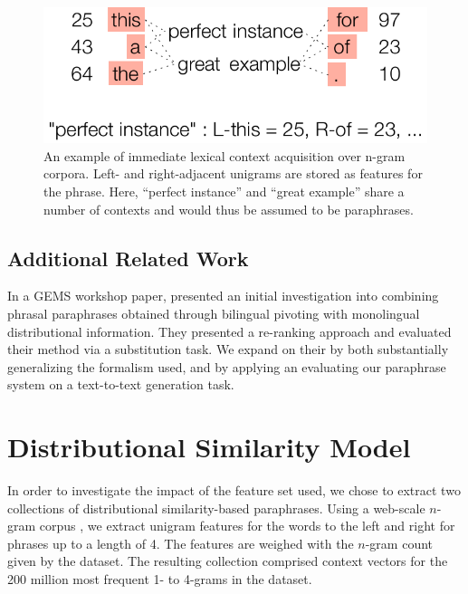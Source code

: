 \documentclass[11pt]{article}
\begin{document}
\begin{figure}[!t]
\begin{center}
\includegraphics[width=0.99\linewidth]{figures/ngram_context.pdf}
\end{center}
\caption{An example of immediate lexical context acquisition over
  n-gram corpora. Left- and right-adjacent unigrams are stored as
  features for the phrase. Here, ``perfect instance'' and ``great
  example'' share a number of contexts and would thus be assumed to be
  paraphrases.}\label{fig-ngram-context}
\end{figure}


\subsection{Additional Related Work}

In a GEMS workshop paper,  presented an initial investigation into combining phrasal
paraphrases obtained through bilingual pivoting with monolingual
distributional information. They presented a re-ranking approach and
evaluated their method via a substitution task. We expand on their by
both substantially generalizing the formalism used, and by applying an
evaluating our paraphrase system on a text-to-text generation task.


\section{Distributional Similarity Model}
In order to investigate the impact of the feature set used, we chose
to extract two collections of distributional similarity-based
paraphrases. Using a web-scale $n$-gram corpus
\cite{GoogleNgrams,LinEtAlLREC10}, we extract unigram features for the
words to the left and right for phrases up to a length of 4. The
features are weighed with the $n$-gram count given by the dataset. The
resulting collection comprised context vectors for the 200 million
most frequent 1- to 4-grams in the dataset.
\end{document}
